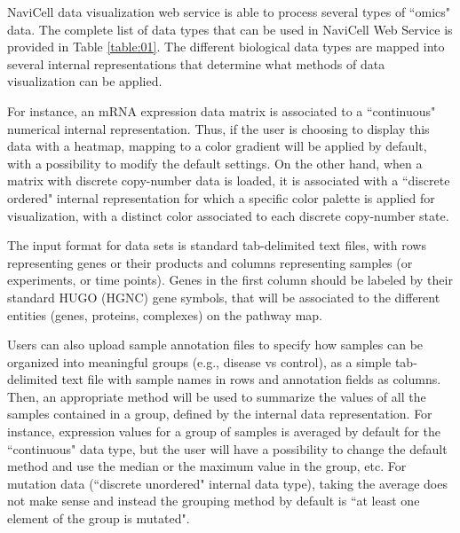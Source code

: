 \documentclass[a4,center,fleqn]{NAR}
\begin{document}
NaviCell data visualization web service is able to process
several types of ``omics" data. The complete list of data types that can be used in NaviCell Web Service
is provided in Table \ref{table:01}. The different biological data
types are mapped into several internal representations that determine what methods
of data visualization can be applied.

For instance, an mRNA expression data matrix is associated to a
``continuous" numerical internal representation. Thus, if the user is choosing to display
this data with a heatmap, mapping to a color gradient will be applied by default, with a possibility
to modify the default settings. On the other hand, when a
matrix with discrete copy-number data is loaded, it is associated with a
``discrete ordered" internal representation for which
a specific color palette is applied for visualization,
with a distinct color associated to each discrete copy-number state.

The input format for data sets is standard tab-delimited text files, with rows
representing genes or their products and columns representing samples (or experiments, or time
points). Genes in the first column should be labeled by their standard HUGO (HGNC)
gene symbols, that will be associated to the different entities (genes,
proteins, complexes) on the pathway map.

Users can also upload sample annotation files to specify how samples can be organized into meaningful groups
(e.g., disease vs control), as a simple tab-delimited text file with sample names in
rows and annotation fields as columns. Then, an appropriate method will be used
to summarize the values of all the samples contained in a group, defined by the
internal data representation. For instance, expression values for a group of samples
is averaged by default for the ``continuous" data type, but the user will have
a possibility to change the default method and use the median or
the maximum value in the group, etc. For mutation data (``discrete unordered" internal data type),
taking the average does not make sense and instead the grouping method by default is
``at least one element of the group is mutated".
\end{document}
